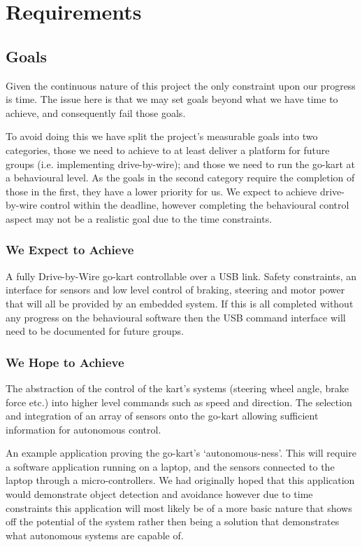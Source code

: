 \chapter{Requirements}
\section{Goals}
Given the continuous nature of this project the only constraint upon our progress is time. The issue here is that we may set goals beyond what we have time to achieve, and consequently fail those goals.

To avoid doing this we have split the project's measurable goals into two categories, those we need to achieve to at least deliver a platform for future groups (i.e. implementing drive-by-wire); and those we need to run the go-kart at a behavioural level. As the goals in the second category require the completion of those in the first, they have a lower priority for us. We expect to achieve drive-by-wire control within the deadline, however completing the behavioural control aspect may not be a realistic goal due to the time constraints.

\subsection{We Expect to Achieve}
A fully Drive-by-Wire go-kart controllable over a USB link. Safety constraints, an interface for sensors and low level control of braking, steering and motor power that will all be provided by an embedded system. If this is all completed without any progress on the behavioural software then the USB command interface will need to be documented for future groups.

\subsection{We Hope to Achieve}
The abstraction of the control of the kart's systems (steering wheel angle, brake force etc.) into higher level commands such as speed and direction. The selection and integration of an array of sensors onto the go-kart allowing sufficient information for autonomous control.

An example application proving the go-kart's `autonomous-ness'. This will require a software application running on a laptop, and the sensors connected to the laptop through a micro-controllers. We had originally hoped that this application would demonstrate object detection and avoidance however due to time constraints this application will most likely be of a more basic nature that shows off the potential of the system rather then being a solution that demonstrates what autonomous systems are capable of.

